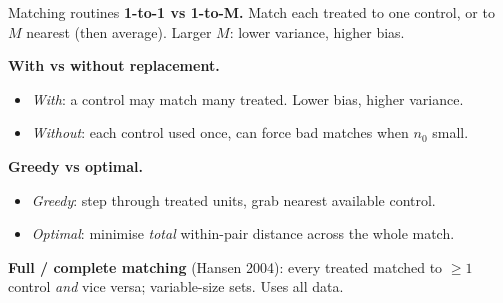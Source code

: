 \documentclass[xcolor=dvipsnames]{beamer}
\begin{document}




\begin{frame}{Matching routines}
\footnotesize
{} \textbf{1-to-1 vs 1-to-M.} Match each treated to one control, or to $M$ nearest (then average). Larger $M$: lower variance, higher bias.

\medskip
{} \textbf{With vs without replacement.}
\begin{itemize}\itemsep1pt
\item \textit{With}: a control may match many treated. Lower bias, higher variance.
\item \textit{Without}: each control used once, can force bad matches when $n_0$ small.
\end{itemize}

\medskip
{} \textbf{Greedy vs optimal.}
\begin{itemize}\itemsep1pt
\item \textit{Greedy}: step through treated units, grab nearest available control.
\item \textit{Optimal}: minimise \textit{total} within-pair distance across the whole match.
\end{itemize}

\medskip
{} \textbf{Full / complete matching} (Hansen 2004): every treated matched to $\geq 1$ control \textit{and} vice versa; variable-size sets. Uses all data.

\end{frame}
\end{document}
